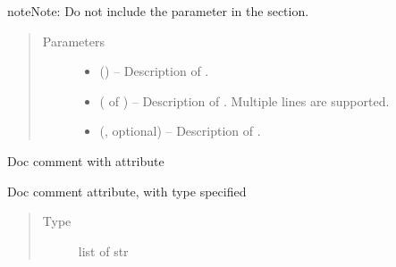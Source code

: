 \documentclass[letterpaper,10pt,english]{sphinxmanual}
\begin{document}
\begin{description}
\begin{fulllineitems}
\begin{fulllineitems}
\begin{sphinxadmonition}{note}{Note:}
Do not include the  parameter in the  section.
\end{sphinxadmonition}
\begin{quote}\begin{description}
\item[{Parameters}] \leavevmode\begin{itemize}
\item {} 
 () – Description of .

\item {} 
 ( of ) – Description of . Multiple
lines are supported.

\item {} 
 (, optional) – Description of .

\end{itemize}

\end{description}\end{quote}

\end{fulllineitems}


\begin{fulllineitems}
\label{\detokenize{autogen:example_docstring.ExampleClass.attr3}}
Doc comment  with attribute

\end{fulllineitems}


\begin{fulllineitems}
\label{\detokenize{autogen:example_docstring.ExampleClass.attr4}}
Doc comment  attribute, with type specified
\begin{quote}\begin{description}
\item[{Type}] \leavevmode
list of str


\end{description}
\end{quote}
\end{fulllineitems}
\end{fulllineitems}
\end{description}
\end{document}
